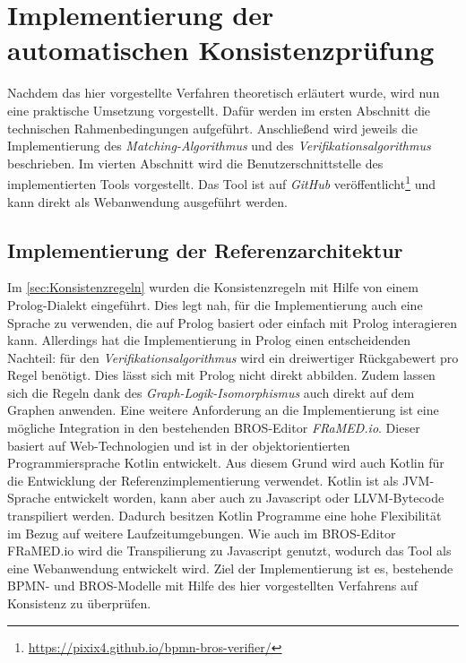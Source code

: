 \chapter{Implementierung der automatischen Konsistenzprüfung}
\label{chap:implementation}

Nachdem das hier vorgestellte Verfahren theoretisch erläutert wurde, wird nun eine praktische Umsetzung vorgestellt.
Dafür werden im ersten Abschnitt die technischen Rahmenbedingungen aufgeführt.
Anschließend wird jeweils die Implementierung des \emph{Matching-Algorithmus} und des \emph{Verifikationsalgorithmus} beschrieben.
Im vierten Abschnitt wird die Benutzerschnittstelle des implementierten Tools vorgestellt.
Das Tool ist auf \emph{GitHub} veröffentlicht\footnote{\url{https://pixix4.github.io/bpmn-bros-verifier/}} und kann direkt als Webanwendung ausgeführt werden.

\section{Implementierung der Referenzarchitektur}

Im \cref{sec:Konsistenzregeln} wurden die Konsistenzregeln mit Hilfe von einem Prolog-Dialekt eingeführt.
Dies legt nah, für die Implementierung auch eine Sprache zu verwenden, die auf Prolog basiert oder einfach mit Prolog interagieren kann.
Allerdings hat die Implementierung in Prolog einen entscheidenden Nachteil: für den \emph{Verifikationsalgorithmus} wird ein dreiwertiger Rückgabewert pro Regel benötigt.
Dies lässt sich mit Prolog nicht direkt abbilden.
Zudem lassen sich die Regeln dank des \emph{Graph-Logik-Isomorphismus} auch direkt auf dem Graphen anwenden.
Eine weitere Anforderung an die Implementierung ist eine mögliche Integration in den bestehenden BROS-Editor \emph{FRaMED.io}.
Dieser basiert auf Web-Technologien und ist in der objektorientierten Programmiersprache Kotlin entwickelt.
Aus diesem Grund wird auch Kotlin für die Entwicklung der Referenzimplementierung verwendet.
Kotlin ist als JVM-Sprache entwickelt worden, kann aber auch zu Javascript oder LLVM-Bytecode transpiliert werden.
Dadurch besitzen Kotlin Programme eine hohe Flexibilität im Bezug auf weitere Laufzeitumgebungen.
Wie auch im BROS-Editor FRaMED.io wird die Transpilierung zu Javascript genutzt, wodurch das Tool als eine Webanwendung entwickelt wird.
Ziel der Implementierung ist es, bestehende BPMN- und BROS-Modelle mit Hilfe des hier vorgestellten Verfahrens auf Konsistenz zu überprüfen.


